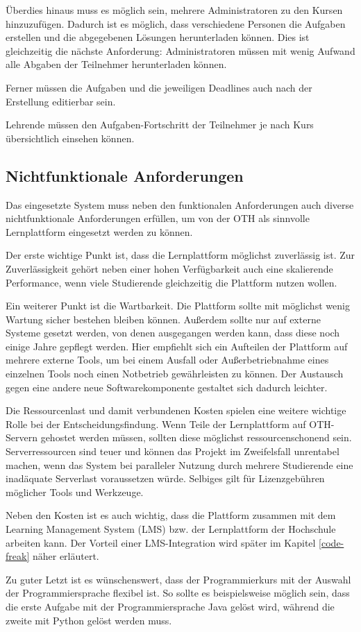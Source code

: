 Überdies hinaus muss es möglich sein, mehrere Administratoren zu den Kursen
hinzuzufügen. Dadurch ist es möglich, dass verschiedene Personen die Aufgaben
erstellen und die abgegebenen Lösungen herunterladen können. Dies ist
gleichzeitig die nächste Anforderung: Administratoren müssen mit wenig
Aufwand alle Abgaben der Teilnehmer herunterladen können.

Ferner müssen die Aufgaben und die jeweiligen Deadlines auch nach der Erstellung
editierbar sein.

Lehrende müssen den Aufgaben-Fortschritt der Teilnehmer je nach Kurs 
übersichtlich einsehen können.
\subsection{Nichtfunktionale Anforderungen}
\label{anforderungsanalyse-nichtfunktional}
Das eingesetzte System muss neben den funktionalen Anforderungen auch diverse
nichtfunktionale Anforderungen erfüllen, um von der OTH als sinnvolle
Lernplattform eingesetzt werden zu können.

Der erste wichtige Punkt ist, dass die Lernplattform möglichst zuverlässig ist.
Zur Zuverlässigkeit gehört neben einer hohen Verfügbarkeit auch eine skalierende
Performance, wenn viele Studierende gleichzeitig die Plattform nutzen wollen.

Ein weiterer Punkt ist die Wartbarkeit. Die Plattform sollte mit möglichst wenig
Wartung sicher bestehen bleiben können. Außerdem sollte nur auf externe Systeme
gesetzt werden, von denen ausgegangen werden kann, dass diese noch einige Jahre
gepflegt werden. Hier empfiehlt sich ein Aufteilen der Plattform auf mehrere
externe Tools, um bei einem Ausfall oder Außerbetriebnahme eines einzelnen Tools
noch einen Notbetrieb gewährleisten zu können. Der Austausch gegen eine andere
neue Softwarekomponente gestaltet sich dadurch leichter.

Die Ressourcenlast und damit verbundenen Kosten spielen eine weitere wichtige
Rolle bei der Entscheidungsfindung. Wenn Teile der Lernplattform auf OTH-Servern
gehostet werden müssen, sollten diese möglichst ressourcenschonend sein.
Serverressourcen sind teuer und können das Projekt im Zweifelsfall unrentabel
machen, wenn das System bei paralleler Nutzung durch mehrere Studierende eine
inadäquate Serverlast voraussetzen würde. Selbiges gilt für Lizenzgebühren
möglicher Tools und Werkzeuge.

Neben den Kosten ist es auch wichtig, dass die Plattform zusammen mit dem
Learning Management System (LMS) bzw. der Lernplattform der Hochschule arbeiten
kann. Der Vorteil einer LMS-Integration wird später im Kapitel
\ref{code-freak} näher erläutert.

Zu guter Letzt ist es wünschenswert, dass der Programmierkurs mit der Auswahl
der Programmiersprache flexibel ist. So sollte es beispielsweise möglich sein,
dass die erste Aufgabe mit der Programmiersprache Java gelöst wird,
während die zweite mit Python gelöst werden muss.